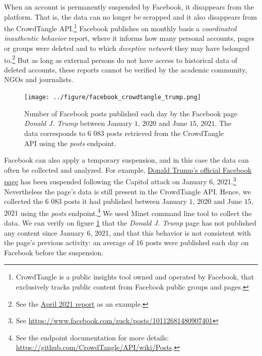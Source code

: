 \documentclass{article}
\begin{document}
When an account is permanently suspended by Facebook, it disappears from the platform. That is,  the data can no longer be scrapped and it also disappears from the CrowdTangle API.\footnote{CrowdTangle is a public insights tool owned and operated by Facebook, that exclusively tracks public content from Facebook public groups and pages.} Facebook publishes on monthly basis a {\it coordinated inauthentic behavior} report, where it informs how many personal accounts, pages or groups were deleted and to which {\it deceptive network} they may have belonged to.\footnote{See the \href{https://about.fb.com/news/2021/05/april-2021-coordinated-inauthentic-behavior-report/}{April 2021 report} as an example.} 
But as long as external persons do not have access to historical data of deleted accounts, these reports cannot be verified by the academic community, NGOs and journalists.

\begin{figure}[h]
	\centering
			\texttt{[image: ../figure/facebook\_crowdtangle\_trump.png]}
	\caption{Number of Facebook posts published each day by the Facebook page {\it Donald J. Trump} between January $1$, $2020$ and June $15$, $2021$. The data corresponds to $6$ $083$ posts retrieved from the CrowdTangle API using the {\it posts} endpoint.}
	\label{fig1_fb}
\end{figure}

Facebook can also apply a temporary suspension, and in this case the data can often be collected and analyzed. For example, \href{https://www.facebook.com/DonaldTrump/}{Donald Trump’s official Facebook page}  has been suspended following the Capitol attack on January 6, 2021.\footnote{See \href{https://www.facebook.com/zuck/posts/10112681480907401}{https://www.facebook.com/zuck/posts/10112681480907401}} Nevertheless the page’s data is still present in the CrowdTangle API. 
Hence, we collected the $6$ $083$ posts it had published between January $1$, $2020$ and June $15$, $2021$ using the {\it posts} endpoint.\footnote{See the endpoint documentation for more details: \href{https://github.com/CrowdTangle/API/wiki/Posts}{https://github.com/CrowdTangle/API/wiki/Posts}.} We used Minet command line tool \cite{minet} to collect the data. We can verify on figure \ref{fig1_fb} that the {\it Donald J. Trump} page has not published any content since January $6$, 2021, and that this behavior is not consistent with the page’s previous activity: an average of $16$ posts were published each day on Facebook before the suspension. 
\end{document}
